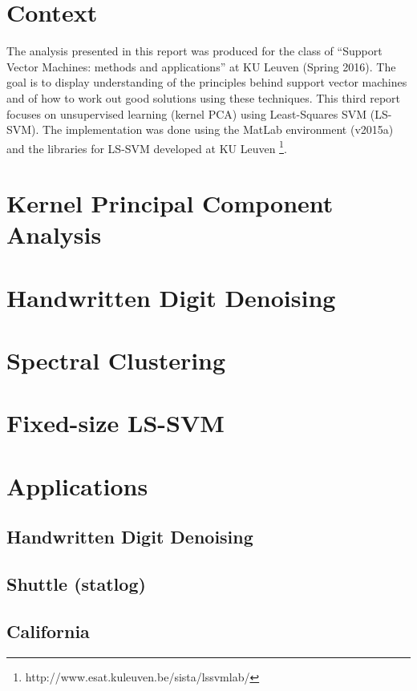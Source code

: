 \documentclass[11pt, a4paper]{article}
\begin{document}

\tableofcontents
\newpage

\section*{Context}

The analysis presented in this report was produced for the class of
``Support Vector Machines: methods and applications'' at KU Leuven
(Spring 2016). The goal is to display understanding of the principles
behind support vector machines and of how to work out good solutions
using these techniques. This third report focuses on unsupervised
learning (kernel PCA) using Least-Squares SVM (LS-SVM). The
implementation was done using the MatLab environment (v2015a) and the
libraries for LS-SVM developed at KU Leuven
\footnote{http://www.esat.kuleuven.be/sista/lssvmlab/}.

\section{Kernel Principal Component Analysis}

\section{Handwritten Digit Denoising}

\section{Spectral Clustering}

\section{Fixed-size LS-SVM}

\section{Applications}

\subsection{Handwritten Digit Denoising}

\subsection{Shuttle (statlog)}

\subsection{California}

% 
\end{document}
